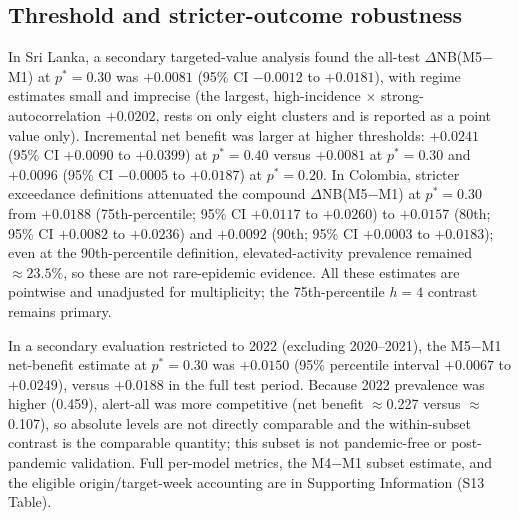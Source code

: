 \documentclass[11pt,a4paper]{article}
\begin{document}
\subsection{Threshold and stricter-outcome robustness}
In Sri Lanka, a secondary targeted-value analysis found the all-test $\Delta$NB(M5$-$M1) at $p^*=0.30$ was $+0.0081$ (95\% CI $-0.0012$ to $+0.0181$), with regime estimates small and imprecise (the largest, high-incidence $\times$ strong-autocorrelation $+0.0202$, rests on only eight clusters and is reported as a point value only). Incremental net benefit was larger at higher thresholds: $+0.0241$ (95\% CI $+0.0090$ to $+0.0399$) at $p^*=0.40$ versus $+0.0081$ at $p^*=0.30$ and $+0.0096$ (95\% CI $-0.0005$ to $+0.0187$) at $p^*=0.20$. In Colombia, stricter exceedance definitions attenuated the compound $\Delta$NB(M5$-$M1) at $p^*=0.30$ from $+0.0188$ (75th-percentile; 95\% CI $+0.0117$ to $+0.0260$) to $+0.0157$ (80th; 95\% CI $+0.0082$ to $+0.0236$) and $+0.0092$ (90th; 95\% CI $+0.0003$ to $+0.0183$); even at the 90th-percentile definition, elevated-activity prevalence remained $\approx23.5\%$, so these are not rare-epidemic evidence. All these estimates are pointwise and unadjusted for multiplicity; the 75th-percentile $h=4$ contrast remains primary.

In a secondary evaluation restricted to 2022 (excluding 2020--2021), the M5$-$M1 net-benefit estimate at $p^*=0.30$ was $+0.0150$ (95\% percentile interval $+0.0067$ to $+0.0249$), versus $+0.0188$ in the full test period. Because 2022 prevalence was higher (0.459), alert-all was more competitive (net benefit $\approx$0.227 versus $\approx$0.107), so absolute levels are not directly comparable and the within-subset contrast is the comparable quantity; this subset is not pandemic-free or post-pandemic validation. Full per-model metrics, the M4$-$M1 subset estimate, and the eligible origin/target-week accounting are in Supporting Information (S13 Table).
\end{document}
